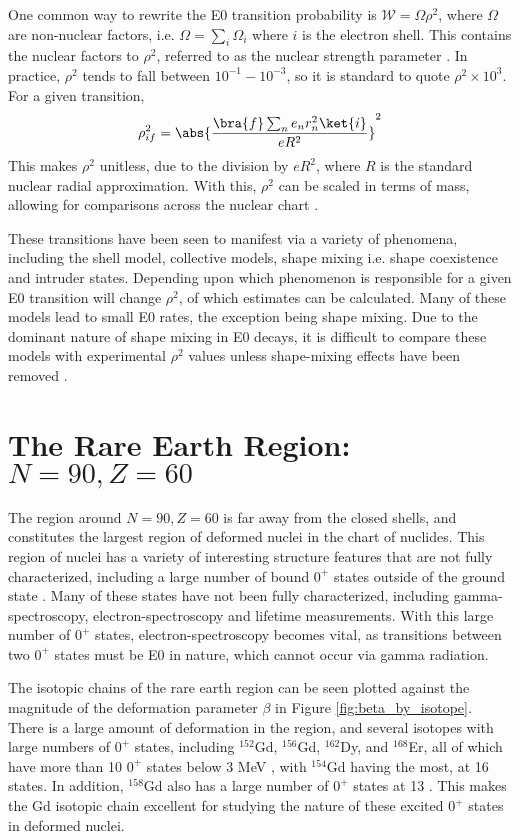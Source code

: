 One common way to rewrite the E0 transition probability is 
$\mathcal{W}=\Omega\rho^2$, where $\Omega$ are non-nuclear factors, i.e. $\Omega=\sum_i\Omega_i$ where $i$ is the electron shell. This contains the nuclear factors to $\rho^2$, referred to as the nuclear strength parameter \citep{church56:_monopole,wood99:_e0}. In practice, $\rho^2$ tends to fall between $10^{-1}-10^{-3}$, so it is standard to quote $\rho^2\times10^3$. For a given transition, \begin{equation}
    \rho^2_{if}=\abs{\frac{\bra{f}\sum_ne_nr_n^2\ket{i}}{eR^2}}^2
\end{equation}
This makes $\rho^2$ unitless, due to the division by $eR^2$, where $R$ is the standard nuclear radial approximation. With this, $\rho^2$ can be scaled in terms of mass, allowing for comparisons across the nuclear chart \citep{wood99:_e0}.

These transitions have been seen to manifest via a variety of phenomena, including the shell model, collective models, shape mixing i.e. shape coexistence and intruder states\citep{wood99:_e0}. Depending upon which phenomenon is responsible for a given E0 transition will change $\rho^2$, of which estimates can be calculated. Many of these models lead to small E0 rates, the exception being shape mixing. Due to the dominant nature of shape mixing in E0 decays, it is difficult to compare these models with experimental $\rho^2$ values unless shape-mixing effects have been removed \citep{wood99:_e0}.

\section{The Rare Earth Region: $N=90,Z=60$}

The region around $N=90,Z=60$ is far away from the closed shells, and constitutes the largest region of deformed nuclei in the chart of nuclides. This region of nuclei has a variety of interesting structure features that are not fully characterized, including a large number of bound $0^+$ states outside of the ground state \citep{meyer06:_zeroplus}. Many of these states have not been fully characterized, including gamma-spectroscopy, electron-spectroscopy and lifetime measurements. With this large number of $0^+$ states, electron-spectroscopy becomes vital, as transitions between two $0^+$ states must be E0 in nature, which cannot occur via gamma radiation.

The isotopic chains of the rare earth region can be seen plotted against the magnitude of the deformation parameter $\beta$ in Figure \ref{fig:beta_by_isotope}. There is a large amount of deformation in the region, and several isotopes with large numbers of $0^+$ states, including $^{152}$Gd, $^{156}$Gd, $^{162}$Dy, and $^{168}$Er, all of which have more than 10 $0^+$ states below 3 MeV \citep{meyer06:_zeroplus}, with $^{154}$Gd having the most, at 16 states. In addition, $^{158}$Gd also has a large number of $0^+$ states at 13 \citep{lesher02:_158gd}. This makes the Gd isotopic chain excellent for studying the nature of these excited $0^+$ states in deformed nuclei.

